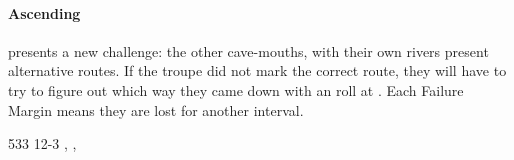 \documentclass[10pt,twoside]{book}
\begin{document}
\showTalisman


\paragraph{Ascending}
presents a new challenge: the other cave-mouths, with their own rivers present alternative routes.
If the troupe did not mark the correct route, they will have to try to figure out which way they came down with an  roll at \tn[10].
Each Failure Margin means they are lost for another \gls{interval}.

\clearpage

%
  {{5}{3}{3}}%
  {{1}{2}{-3}}%
  {
  }%
  {\lucky}%
  {}%
  {\flight, \quadruped, }%

\label{theDragon}

{
  \scriptsize
}
\end{document}

